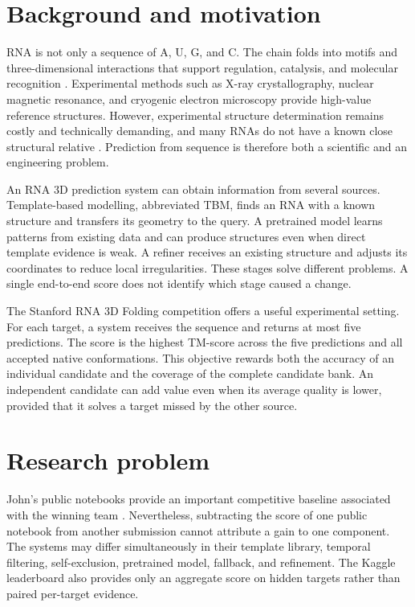 \documentclass[12pt,a4paper,oneside]{report}
\begin{document}
\section{Background and motivation}

RNA is not only a sequence of A, U, G, and C. The chain folds into motifs and
three-dimensional interactions that support regulation, catalysis, and molecular
recognition \cite{cao_rna_functions,tinoco_folding,butcher_tertiary}. Experimental
methods such as X-ray crystallography, nuclear magnetic resonance, and cryogenic
electron microscopy provide high-value reference structures. However, experimental
structure determination remains costly and technically demanding, and many RNAs do
not have a known close structural relative \cite{zhang_experimental_review,ma_cryoem}.
Prediction from sequence is therefore both a scientific and an engineering problem.

An RNA 3D prediction system can obtain information from several sources.
Template-based modelling, abbreviated TBM, finds an RNA with a known structure and
transfers its geometry to the query. A pretrained model learns patterns from existing
data and can produce structures even when direct template evidence is weak. A refiner
receives an existing structure and adjusts its coordinates to reduce local
irregularities. These stages solve different problems. A single end-to-end score does
not identify which stage caused a change.

The Stanford RNA 3D Folding competition offers a useful experimental setting. For each
target, a system receives the sequence and returns at most five predictions. The score
is the highest TM-score across the five predictions and all accepted native
conformations. This objective rewards both the accuracy of an individual candidate and
the coverage of the complete candidate bank. An independent candidate can add value
even when its average quality is lower, provided that it solves a target missed by the
other source.

\section{Research problem}

John's public notebooks provide an important competitive baseline associated with the
winning team \cite{kaggle_top1,kaggle_hybrid}. Nevertheless, subtracting the score of
one public notebook from another submission cannot attribute a gain to one component.
The systems may differ simultaneously in their template library, temporal filtering,
self-exclusion, pretrained model, fallback, and refinement. The Kaggle leaderboard
also provides only an aggregate score on hidden targets rather than paired per-target
evidence.
\end{document}
